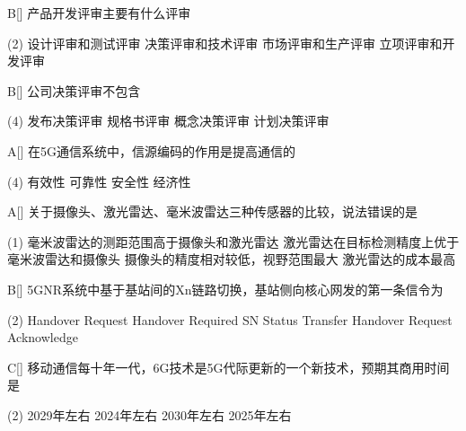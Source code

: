 \begin{choice}{B}[]
    产品开发评审主要有什么评审
    \begin{tasks}(2)
        \task 设计评审和测试评审
        \task 决策评审和技术评审
        \task 市场评审和生产评审
        \task 立项评审和开发评审
    \end{tasks}
\end{choice}

\begin{choice}{B}[]
    公司决策评审不包含
    \begin{tasks}(4)
        \task 发布决策评审
        \task 规格书评审
        \task 概念决策评审
        \task 计划决策评审
    \end{tasks}
\end{choice}




\begin{choice}{A}[]
    在5G通信系统中，信源编码的作用是提高通信的
    \begin{tasks}(4)
        \task 有效性
        \task 可靠性
        \task 安全性
        \task 经济性
    \end{tasks}
\end{choice}


\begin{choice}{A}[]
    关于摄像头、激光雷达、毫米波雷达三种传感器的比较，说法错误的是
    \begin{tasks}(1)
        \task 毫米波雷达的测距范围高于摄像头和激光雷达
        \task 激光雷达在目标检测精度上优于毫米波雷达和摄像头
        \task 摄像头的精度相对较低，视野范围最大
        \task 激光雷达的成本最高
    \end{tasks}
\end{choice}


\begin{choice}{B}[]
    5G\;NR系统中基于基站间的Xn链路切换，基站侧向核心网发的第一条信令为
    \begin{tasks}(2)
        \task Handover Request
        \task Handover Required
        \task SN Status Transfer
        \task Handover Request Acknowledge
    \end{tasks}
\end{choice}


\begin{choice}{C}[]
    移动通信每十年一代，6G技术是5G代际更新的一个新技术，预期其商用时间是
    \begin{tasks}(2)
        \task 2029年左右
        \task 2024年左右
        \task 2030年左右
        \task 2025年左右
    \end{tasks}
\end{choice}

